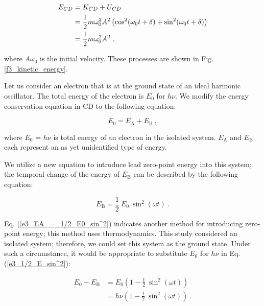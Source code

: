 \documentclass[%
 reprint,
 amsmath,amssymb,
 aps,
]{revtex4-1}
\numberwithin{equation}{section}
\begin{document}
        \begin{align}
            E_{CD}
                &= K_{CD} + U_{CD}    \notag \\
                &= \frac{1}{2} m \omega_{0}^{2} A^{2} \left( \cos^{2} (\omega_{0} t + \delta) + \sin^{2}(\omega_{0} t +\delta) \right)    \notag \\
                &= \frac{1}{2} m \omega_{0}^{2} A^{2}
                \ .
        \end{align}

    \noindent
    where $A \omega_{0}$ is the initial velocity. These processes are shown in Fig. \ref{f3_kinetic_energy}.

    Let us consider an electron that is at the ground state of an ideal harmonic oscillator. The total energy of the electron is $E_{0}$ for $h \nu$. We modify the energy conservation equation in CD to the following equation:

        \begin{equation}
            E_{0} = E_{\mathrm{A}} + E_{\mathrm{B}}
            \ ,
            \label{e3_EA+EB}
        \end{equation}

    \noindent
    where $E_{0}$ = $h \nu$ is total energy of an electron in the isolated system. $E_{\mathrm{A}}$ and $E_{\mathrm{B}}$ each represent an as yet unidentified type of energy.

    We utilize a new equation to introduce lead zero-point energy into this system; the temporal change of the energy of $E_{\mathrm{B}}$ can be described by the following equation:

        \begin{equation}
            E_{\mathrm{B}} = \frac{1}{2} \ E_{0} \ \sin^{2} (\omega t)
            \ .
            \label{e3_EA_=_1/2_E0_sin^2}
        \end{equation}

    Eq. (\ref{e3_EA_=_1/2_E0_sin^2}) indicates another method for introducing zero-point energy; this method uses thermodynamics. This study considered an isolated system; therefore, we could set this system as the ground state. Under such a circumstance, it would be appropriate to substitute $E_{0}$ for $h\nu$ in Eq. (\ref{e3_1/2_E_sin^2}):

        \begin{equation}
            \begin{split}
                E_{0} - E_{\mathrm{B}}
                    &=  E_{0} \left(1 - \frac{1}{2} \ \sin^{2} (\omega t) \right) \\
                    &=  h\nu \left(1 - \frac{1}{2} \ \sin^{2} (\omega t) \right)
                    \ .
                    \label{e3_1/2_E_sin^2}
            \end{split}
        \end{equation}
\end{document}
